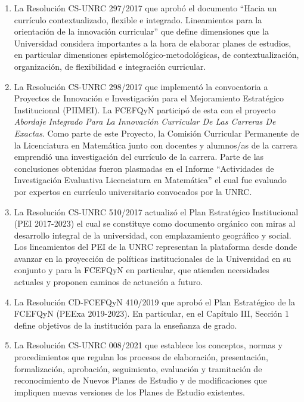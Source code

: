 \documentclass[a4paper, 12pt]{article}
\begin{document}
\begin{enumerate}
 \item La Resolución CS-UNRC 297/2017 que aprobó el documento ``Hacia   un   currículo contextualizado, flexible e integrado. Lineamientos para la orientación de la innovación  curricular'' que define dimensiones que la Universidad considera importantes a la hora de elaborar planes de estudios, en particular dimensiones epistemológico-metodológicas, de contextualización, organización, de flexibilidad e integración curricular. 

 \item La Resolución CS-UNRC 298/2017  que implementó  la convocatoria a  Proyectos de Innovación e Investigación para el Mejoramiento Estratégico Institucional (PIIMEI). La FCEFQyN  participó de esta con el proyecto \emph{Abordaje Integrado Para La Innovación Curricular De Las Carreras De
Exactas}. Como parte de este Proyecto, la Comisión Curricular Permanente de la Licenciatura en Matemática junto con docentes y alumnos/as de la carrera emprendió una investigación del currículo de la carrera.  Parte de las conclusiones obtenidas fueron plasmadas  en el Informe ``Actividades de Investigación Evaluativa
Licenciatura en Matemática'' el cual fue evaluado por expertos en currículo universitario  convocados por la UNRC.

\item La Resolución CS-UNRC 510/2017  actualizó el Plan Estratégico Institucional (PEI 2017-2023) el cual se constituye como documento orgánico con miras al desarrollo integral de la universidad, con emplazamiento geográfico y social. Los lineamientos del PEI de la UNRC representan la plataforma desde donde avanzar en la proyección de políticas institucionales de la Universidad en su conjunto y para la FCEFQyN en particular, que atienden necesidades actuales y proponen caminos de actuación a futuro.

\item La Resolución CD-FCEFQyN 410/2019 que aprobó  el Plan Estratégico de la FCEFQyN (PEExa 2019-2023). En particular, en el Capítulo III, Sección 1 define objetivos de la institución para la enseñanza de grado.   

 \item La Resolución CS-UNRC 008/2021 que establece los conceptos, normas y procedimientos que regulan los procesos de elaboración, presentación, formalización, aprobación, seguimiento, evaluación y tramitación de reconocimiento de Nuevos Planes de Estudio y de modificaciones que impliquen nuevas versiones de los Planes de Estudio existentes.

\end{enumerate}
\end{document}
